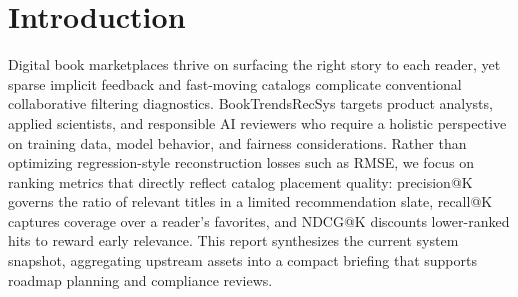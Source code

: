 \section{Introduction}
Digital book marketplaces thrive on surfacing the right story to each reader, yet sparse implicit feedback and fast-moving catalogs complicate conventional collaborative filtering diagnostics. BookTrendsRecSys targets product analysts, applied scientists, and responsible AI reviewers who require a holistic perspective on training data, model behavior, and fairness considerations. Rather than optimizing regression-style reconstruction losses such as RMSE, we focus on ranking metrics that directly reflect catalog placement quality: precision@K governs the ratio of relevant titles in a limited recommendation slate, recall@K captures coverage over a reader's favorites, and NDCG@K discounts lower-ranked hits to reward early relevance. This report synthesizes the current system snapshot, aggregating upstream assets into a compact briefing that supports roadmap planning and compliance reviews.
